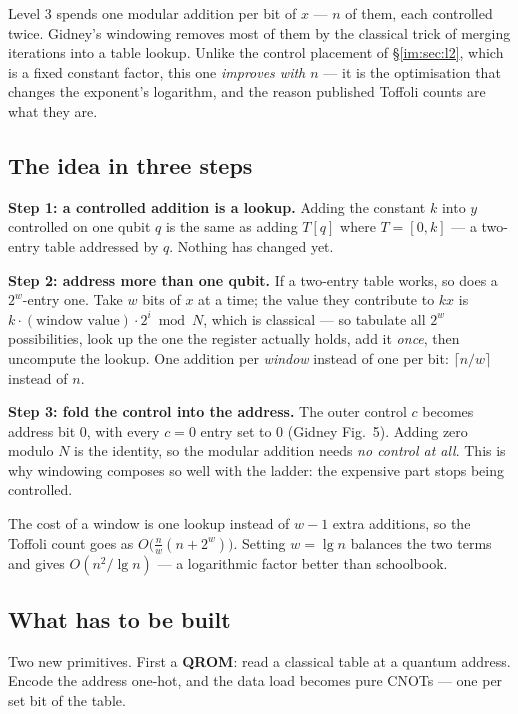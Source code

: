\documentclass[11pt]{article}
\theoremstyle{plain}
\theoremstyle{remark}
\begin{document}
Level 3 spends one modular addition per bit of $x$ --- $n$ of them, each controlled twice. Gidney's
windowing \cite{gidney-window} removes most of them by the classical trick of merging iterations
into a table lookup. Unlike the control placement of \S\ref{im:sec:l2}, which is a fixed constant
factor, this one \emph{improves with $n$} --- it is the optimisation that changes the exponent's
logarithm, and the reason published Toffoli counts are what they are.

\subsection{The idea in three steps}

\textbf{Step 1: a controlled addition is a lookup.} Adding the constant $k$ into $y$ controlled on
one qubit $q$ is the same as adding $T[q]$ where $T=[0,k]$ --- a two-entry table addressed by $q$.
Nothing has changed yet.

\textbf{Step 2: address more than one qubit.} If a two-entry table works, so does a $2^w$-entry one.
Take $w$ bits of $x$ at a time; the value they contribute to $kx$ is
$k\cdot(\text{window value})\cdot2^i \bmod N$, which is classical --- so tabulate all $2^w$
possibilities, look up the one the register actually holds, add it \emph{once}, then uncompute the
lookup. One addition per \emph{window} instead of one per bit: $\lceil n/w\rceil$ instead of $n$.

\textbf{Step 3: fold the control into the address.} The outer control $c$ becomes address bit $0$,
with every $c=0$ entry set to $0$ (Gidney Fig.~5). Adding zero modulo $N$ is the identity, so the
modular addition needs \emph{no control at all}. This is why windowing composes so well with the
ladder: the expensive part stops being controlled.

The cost of a window is one lookup instead of $w-1$ extra additions, so the Toffoli count goes as
$O\!\big(\tfrac nw(n+2^w)\big)$. Setting $w=\lg n$ balances the two terms and gives
$O(n^2/\lg n)$ --- a logarithmic factor better than schoolbook.

\subsection{What has to be built}

Two new primitives. First a \textbf{QROM}: read a classical table at a quantum address. Encode the
address one-hot, and the data load becomes pure CNOTs --- one per set bit of the table.
\end{document}

